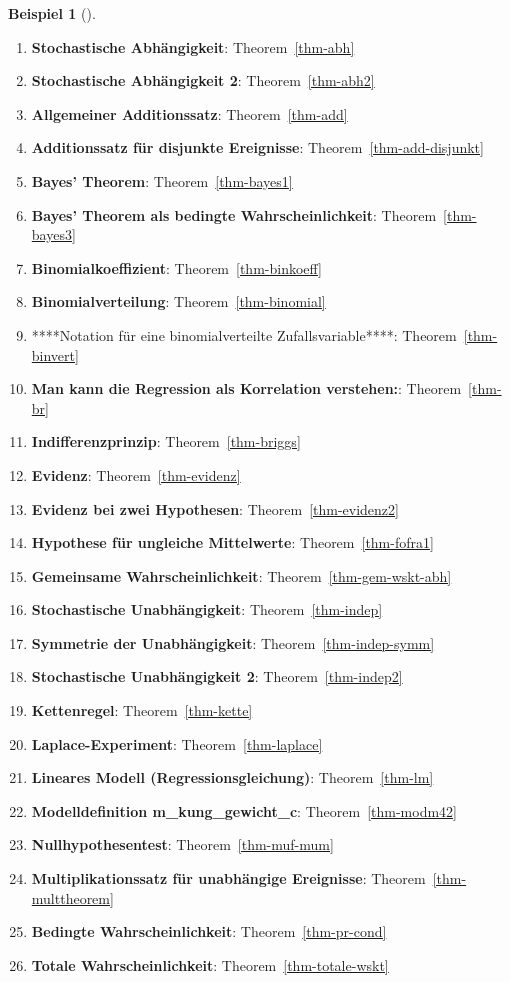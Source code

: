 \documentclass[
  ngerman,
  letterpaper,
  twoside,
  open=any]{scrbook}
\theoremstyle{definition}
\newtheorem{example}{Beispiel}[chapter]
\theoremstyle{plain}
\theoremstyle{definition}
\theoremstyle{definition}
\theoremstyle{remark}
\begin{document}
\begin{example}[]
\begin{enumerate}
\def\labelenumi{\arabic{enumi}.}
\item
  \textbf{Stochastische Abhängigkeit}: Theorem~\ref{thm-abh}
\item
  \textbf{Stochastische Abhängigkeit 2}: Theorem~\ref{thm-abh2}
\item
  \textbf{Allgemeiner Additionssatz}: Theorem~\ref{thm-add}
\item
  \textbf{Additionssatz für disjunkte Ereignisse}:
  Theorem~\ref{thm-add-disjunkt}
\item
  \textbf{Bayes' Theorem}: Theorem~\ref{thm-bayes1}
\item
  \textbf{Bayes' Theorem als bedingte Wahrscheinlichkeit}:
  Theorem~\ref{thm-bayes3}
\item
  \textbf{Binomialkoeffizient}: Theorem~\ref{thm-binkoeff}
\item
  \textbf{Binomialverteilung}: Theorem~\ref{thm-binomial}
\item
  ****Notation für eine binomialverteilte Zufallsvariable****:
  Theorem~\ref{thm-binvert}
\item
  \textbf{Man kann die Regression als Korrelation verstehen:}:
  Theorem~\ref{thm-br}
\item
  \textbf{Indifferenzprinzip}: Theorem~\ref{thm-briggs}
\item
  \textbf{Evidenz}: Theorem~\ref{thm-evidenz}
\item
  \textbf{Evidenz bei zwei Hypothesen}: Theorem~\ref{thm-evidenz2}
\item
  \textbf{Hypothese für ungleiche Mittelwerte}: Theorem~\ref{thm-fofra1}
\item
  \textbf{Gemeinsame Wahrscheinlichkeit}: Theorem~\ref{thm-gem-wskt-abh}
\item
  \textbf{Stochastische Unabhängigkeit}: Theorem~\ref{thm-indep}
\item
  \textbf{Symmetrie der Unabhängigkeit}: Theorem~\ref{thm-indep-symm}
\item
  \textbf{Stochastische Unabhängigkeit 2}: Theorem~\ref{thm-indep2}
\item
  \textbf{Kettenregel}: Theorem~\ref{thm-kette}
\item
  \textbf{Laplace-Experiment}: Theorem~\ref{thm-laplace}
\item
  \textbf{Lineares Modell (Regressionsgleichung)}: Theorem~\ref{thm-lm}
\item
  \textbf{Modelldefinition m\_kung\_gewicht\_c}:
  Theorem~\ref{thm-modm42}
\item
  \textbf{Nullhypothesentest}: Theorem~\ref{thm-muf-mum}
\item
  \textbf{Multiplikationssatz für unabhängige Ereignisse}:
  Theorem~\ref{thm-multtheorem}
\item
  \textbf{Bedingte Wahrscheinlichkeit}: Theorem~\ref{thm-pr-cond}
\item
  \textbf{Totale Wahrscheinlichkeit}: Theorem~\ref{thm-totale-wskt}
\end{enumerate}

\end{example}


\backmatter
\end{document}
